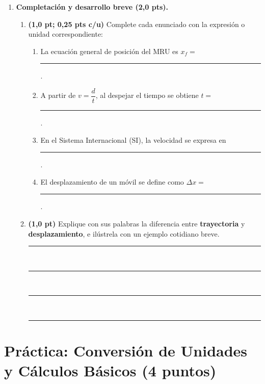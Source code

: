 \documentclass[12pt, letterpaper]{article}
\begin{document}
\begin{enumerate}[leftmargin=*, label=\textbf{\arabic*.}, itemsep=0.2em]
  \item \textbf{Completación y desarrollo breve (2,0 pts).}
        \begin{enumerate}[label=\alph*), leftmargin=1.8em, itemsep=0.7em]
          \item \textbf{(1,0 pt; 0,25 pts c/u)} Complete cada enunciado con la expresión o unidad correspondiente:
                \begin{enumerate}[label=\roman*), leftmargin=1.6em, itemsep=0.6em, topsep=4pt]
                  \item La ecuación general de posición del MRU es $x_f =$ \rule{3.4cm}{0.4pt}.
                  \item A partir de $v = \dfrac{d}{t}$, al despejar el tiempo se obtiene $t =$ \rule{2.6cm}{0.4pt}.
                  \item En el Sistema Internacional (SI), la velocidad se expresa en \rule{2.6cm}{0.4pt}.
                  \item El desplazamiento de un móvil se define como $\Delta x =$ \rule{3.0cm}{0.4pt}.
                \end{enumerate}
          \item \textbf{(1,0 pt)} Explique con sus palabras la diferencia entre \textbf{trayectoria} y \textbf{desplazamiento}, e ilústrela con un ejemplo cotidiano breve. \\[10pt]
                \noindent\rule{\linewidth}{0.4pt}\\[18pt]
                \noindent\rule{\linewidth}{0.4pt}\\[18pt]
                \noindent\rule{\linewidth}{0.4pt}\\[18pt]
                \noindent\rule{\linewidth}{0.4pt}
        \end{enumerate}

\end{enumerate}

\newpage

\section{Práctica: Conversión de Unidades y Cálculos Básicos (4 puntos)}
\end{document}
